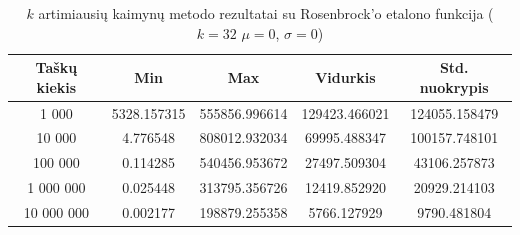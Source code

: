 \begin{table}[H]
    \centering
    \begin{tabular}{|c|c|c|c|c|}
        \hline
        \textbf{Taškų kiekis} & \textbf{Min} & \textbf{Max} & \textbf{Vidurkis} & \textbf{Std. nuokrypis} \\ \hline
        1 000        & 5328.157315 & 555856.996614 & 129423.466021 & 124055.158479 \\ \hline
        10 000       & 4.776548 & 808012.932034 & 69995.488347 & 100157.748101 \\ \hline
        100 000      & 0.114285 & 540456.953672 & 27497.509304 & 43106.257873 \\ \hline
        1 000 000    & 0.025448 & 313795.356726 & 12419.852920 & 20929.214103 \\ \hline
        10 000 000   & 0.002177 & 198879.255358 & 5766.127929 & 9790.481804 \\ \hline
    \end{tabular}
    \caption{$k$ artimiausių kaimynų metodo rezultatai su Rosenbrock'o etalono funkcija ($k = 32$ $\mu = 0$, $\sigma = 0$)}
\end{table}